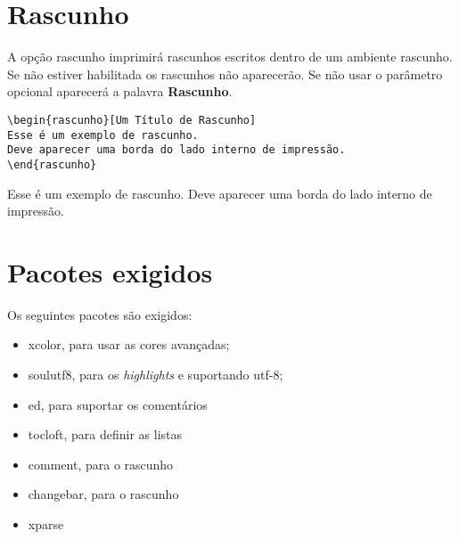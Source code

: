 \documentclass{article}
\begin{document}
\section{Rascunho}

A opção rascunho imprimirá rascunhos escritos dentro de um ambiente rascunho. Se não estiver habilitada os rascunhos não aparecerão. Se não usar o parâmetro opcional aparecerá a palavra \textbf{Rascunho}. 

\begin{verbatim}
\begin{rascunho}[Um Título de Rascunho]
Esse é um exemplo de rascunho. 
Deve aparecer uma borda do lado interno de impressão.
\end{rascunho}
\end{verbatim}

\begin{rascunho}
Esse é um exemplo de rascunho. 
Deve aparecer uma borda do lado interno de impressão.
\end{rascunho}

\section{Pacotes exigidos}

Os seguintes pacotes são exigidos:
\begin{itemize}
    \item xcolor, para usar as cores avançadas;
    \item soulutf8, para os \textit{highlights} e suportando utf-8;
    \item ed, para suportar os comentários
    \item tocloft, para definir as listas 
    \item comment, para o rascunho
    \item changebar, para o rascunho
    \item xparse
\end{itemize}





%
%
\printbibliography

\setlength{\cftassuntonumwidth}{2.5em}
\setlength{\cftcomentarionumwidth}{2.5em}
\setlength{\cftcomentariorefnumwidth}{2.5em}
\newpage
\listofassunto
\newpage
\listofcomentario
\newpage
\listofcomentarioref
\end{document}
